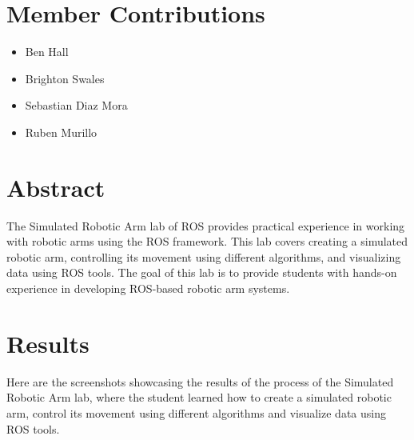 \documentclass{article} %
\begin{document}
\tableofcontents



\setcounter{page}{1} %




%
%

\section{Member Contributions}
	
	\begin{itemize}
	\item Ben Hall
	\item Brighton Swales
	\item Sebastian Diaz Mora
	\item Ruben Murillo
	\end {itemize}

%
%

\section{Abstract} 

The Simulated Robotic Arm lab of ROS provides practical experience in working with robotic arms using the ROS framework. This lab covers creating a simulated robotic arm, controlling its movement using different algorithms, and visualizing data using ROS tools. The goal of this lab is to provide students with hands-on experience in developing ROS-based robotic arm systems.


\newpage 


\section{Results}

Here are the screenshots showcasing the results of the process of the Simulated Robotic Arm lab, where the student learned how to create a simulated robotic arm, control its movement using different algorithms and visualize data using ROS tools.
	
\end{document}
